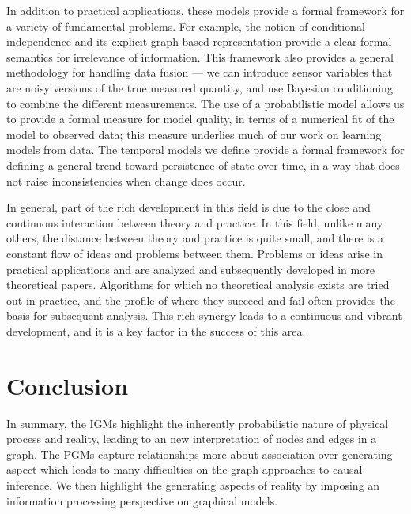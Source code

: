 \documentclass[10pt,onecolumn,letterpaper]{article}
\begin{document}
\begin{CJK*}{UTF8}{gbsn}
In addition to practical applications, these models provide a formal framework for a variety of fundamental problems. For example, the notion of conditional independence and its explicit graph-based representation provide a clear formal semantics for irrelevance of information. This framework also provides a general methodology for handling data fusion — we can introduce sensor variables that are noisy versions of the true measured quantity, and use Bayesian conditioning to combine the different measurements. The use of a probabilistic model allows us to provide a formal measure for model quality, in terms of a numerical fit of the model to observed data; this measure underlies much of our work on learning models from data. The temporal models we define provide a formal framework for defining a general trend toward persistence of state over time, in a way that does not raise inconsistencies when change does occur.

In general, part of the rich development in this field is due to the close and continuous interaction between theory and practice. In this field, unlike many others, the distance between theory and practice is quite small, and there is a constant flow of ideas and problems between them. Problems or ideas arise in practical applications and are analyzed and subsequently developed in more theoretical papers. Algorithms for which no theoretical analysis exists are tried out in practice, and the profile of where they succeed and fail often provides the basis for subsequent analysis. This rich synergy leads to a continuous and vibrant development, and it is a key factor in the success of this area.





\section{Conclusion}

In summary, the IGMs highlight the inherently probabilistic nature of physical process and reality, leading to an new interpretation of nodes and edges in a graph. The PGMs capture relationships more about association over generating aspect which leads to many difficulties on the graph approaches to causal inference. We then highlight the generating aspects of reality by imposing an information processing perspective on graphical models.



\end{CJK*}
\end{document}
